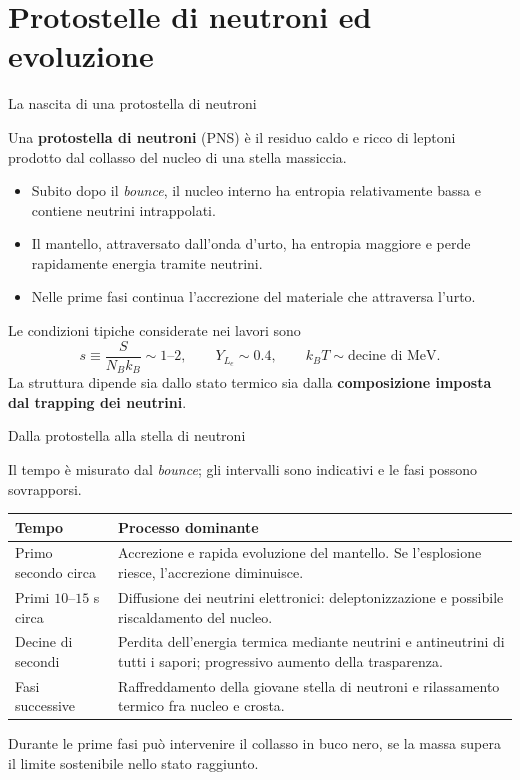 \section{Protostelle di neutroni ed evoluzione}

\begin{frame}[t,label=pns-completa-01]{La nascita di una protostella di neutroni}
\small\raggedright
Una \textbf{protostella di neutroni} (PNS) \`e il residuo caldo
e ricco di leptoni prodotto dal collasso del nucleo di una stella
massiccia.
\begin{itemize}
 \item Subito dopo il \emph{bounce}, il nucleo interno ha
 entropia relativamente bassa e contiene neutrini intrappolati.
 \item Il mantello, attraversato dall'onda d'urto, ha entropia
 maggiore e perde rapidamente energia tramite neutrini.
 \item Nelle prime fasi continua l'accrezione del materiale
 che attraversa l'urto.
\end{itemize}
Le condizioni tipiche considerate nei lavori sono
\[
 s\equiv\frac{S}{N_B k_B}\sim1\text{--}2,
 \qquad Y_{L_e}\sim0.4,
 \qquad k_B T\sim\text{decine di MeV}.
\]
La struttura dipende sia dallo stato termico sia dalla
\textbf{composizione imposta dal trapping dei neutrini}.
\end{frame}

\begin{frame}[t,label=pns-completa-02]{Dalla protostella alla stella di neutroni}
\small\raggedright
Il tempo \`e misurato dal \emph{bounce}; gli intervalli
sono indicativi e le fasi possono sovrapporsi.
\medskip
{\renewcommand{\arraystretch}{1.25}
\begin{tabular}{|p{}|p{}|}
\hline
\textbf{Tempo} & \textbf{Processo dominante} \\
\hline
\raggedright Primo secondo circa & Accrezione e rapida evoluzione del mantello.
Se l'esplosione riesce, l'accrezione diminuisce. \\
\hline
\raggedright Primi $10$--$15$ s circa & Diffusione dei neutrini elettronici:
deleptonizzazione e possibile riscaldamento del nucleo. \\
\hline
\raggedright Decine di secondi & Perdita dell'energia termica mediante neutrini
e antineutrini di tutti i sapori; progressivo aumento della trasparenza. \\
\hline
\raggedright Fasi successive & Raffreddamento della giovane stella di neutroni
e rilassamento termico fra nucleo e crosta. \\
\hline
\end{tabular}}
\medskip
Durante le prime fasi pu\`o intervenire il collasso in buco nero,
se la massa supera il limite sostenibile nello stato raggiunto.
\end{frame}

